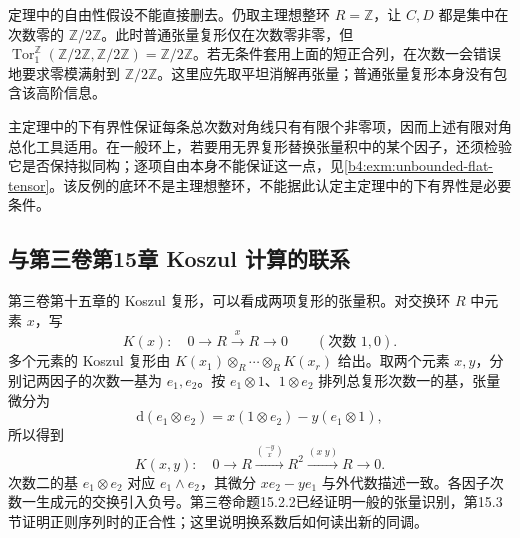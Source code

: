 定理中的自由性假设不能直接删去。仍取主理想整环 \(R=\mathbb Z\)，让 \(C,D\) 都是集中在次数零的 \(\mathbb Z/2\mathbb Z\)。此时普通张量复形仅在次数零非零，但 \(\operatorname{Tor}_1^{\mathbb Z}(\mathbb Z/2\mathbb Z,\mathbb Z/2\mathbb Z)=\mathbb Z/2\mathbb Z\)。若无条件套用上面的短正合列，在次数一会错误地要求零模满射到 \(\mathbb Z/2\mathbb Z\)。这里应先取平坦消解再张量；普通张量复形本身没有包含该高阶信息。

\ProseParagraphBreak
主定理中的下有界性保证每条总次数对角线只有有限个非零项，因而上述有限对角总化工具适用。在一般环上，若要用无界复形替换张量积中的某个因子，还须检验它是否保持拟同构；逐项自由本身不能保证这一点，见\cref{b4:exm:unbounded-flat-tensor}。该反例的底环不是主理想整环，不能据此认定主定理中的下有界性是必要条件。

\subsection{与第三卷第15章 Koszul 计算的联系}
\label{b4:subsec:0904:03}

第三卷第十五章的 Koszul 复形，可以看成两项复形的张量积。对交换环 \(R\) 中元素 \(x\)，写
\[
	K(x):\quad 0\longrightarrow R\xrightarrow{x}R\longrightarrow0 \qquad(\text{次数 }1,0).
\]
多个元素的 Koszul 复形由 \(K(x_1)\otimes_R\cdots\otimes_R K(x_r)\) 给出。取两个元素 \(x,y\)，分别记两因子的次数一基为 \(e_1,e_2\)。按 \(e_1\otimes1\)、\(1\otimes e_2\) 排列总复形次数一的基，张量微分为
\[
	\mathrm{d}(e_1\otimes e_2)=x(1\otimes e_2)-y(e_1\otimes1),
\]
所以得到
\[
	K(x,y):\quad 0\longrightarrow R\xrightarrow{\binom{-y}{x}}R^2 \xrightarrow{(x\;y)}R\longrightarrow0.
\]
次数二的基 \(e_1\otimes e_2\) 对应 \(e_1\wedge e_2\)，其微分 \(xe_2-ye_1\) 与外代数描述一致。各因子次数一生成元的交换引入负号。第三卷命题15.2.2已经证明一般的张量识别，第15.3节证明正则序列时的正合性；这里说明换系数后如何读出新的同调。

